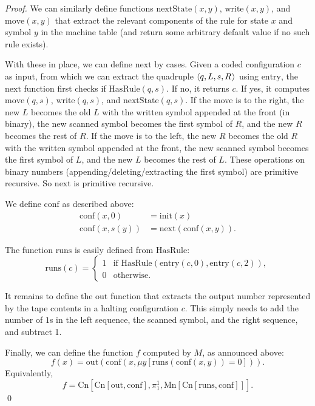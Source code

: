 \begin{proof}
  We can similarly define functions
  $\mathrm{nextState}(x,y)$,
  $\mathrm{write}(x,y)$, and
  $\mathrm{move}(x,y)$
  that extract the relevant components of the rule for state $x$ and symbol $y$
  in the machine table
  (and return some arbitrary default value if no such rule exists).

  With these in place,
  we can define $\mathrm{next}$ by cases.
  Given a coded configuration $c$ as input,
  from which we can extract the quadruple $\t{q,L,s,R}$ using $\mathrm{entry}$,
  the $\mathrm{next}$ function first checks if $\mathrm{HasRule}(q,s)$.
  If no,
  it returns $c$.
  If yes,
  it computes $\mathrm{move}(q,s)$, $\mathrm{write}(q,s)$, and $\mathrm{nextState}(q,s)$.
  If the move is to the right,
  the new $L$ becomes the old $L$ with the written symbol appended at the front (in binary),
  the new scanned symbol becomes the first symbol of $R$,
  and the new $R$ becomes the rest of $R$.
  If the move is to the left,
  the new $R$ becomes the old $R$ with the written symbol appended at the front,
  the new scanned symbol becomes the first symbol of $L$,
  and the new $L$ becomes the rest of $L$.
  These operations on binary numbers (appending/deleting/extracting the first symbol) are primitive recursive.
  So $\mathrm{next}$ is primitive recursive.

  We define $\mathrm{conf}$ as described above:
  \begin{align*}
    \mathrm{conf}(x,0) &= \mathrm{init}(x)\\
    \mathrm{conf}(x,s(y)) &= \mathrm{next}(\mathrm{conf}(x,y)).
  \end{align*}

  The function $\mathrm{runs}$ is easily defined from $\mathrm{HasRule}$:
  \[
    \mathrm{runs}(c) = \begin{cases}
      1 & \text{if } \mathrm{HasRule}(\mathrm{entry}(c,0),\mathrm{entry}(c,2)),\\
      0 & \text{otherwise.}
    \end{cases}
  \]

  It remains to define the $\mathrm{out}$ function that extracts
  the output number represented by the tape contents
  in a halting configuration $c$.
  This simply needs to add the number of $1$s
  in the left sequence, the scanned symbol, and the right sequence,
  and subtract 1.

  Finally, we can define the function $f$ computed by $M$,
  as announced above:
  \[
    f(x) = \mathrm{out}(\mathrm{conf}(x, \mu y[\mathrm{runs}(\mathrm{conf}(x,y))=0])).
  \]
  Equivalently,
  \[
    f = \mathrm{Cn}[\mathrm{Cn}[\mathrm{out}, \mathrm{conf}], \pi^1_1, \mathrm{Mn}[\mathrm{Cn}[\mathrm{runs}, \mathrm{conf}]]].
  \]
  \qed
\end{proof}

